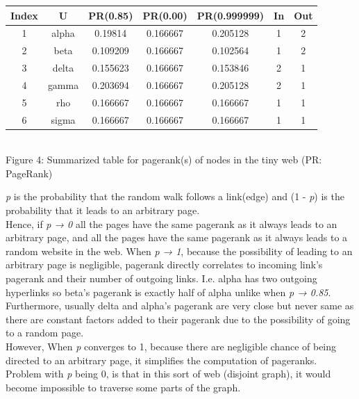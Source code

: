 \documentclass[unicode,11pt,a4paper,oneside,numbers=endperiod,openany]{scrartcl}
\begin{document}
\begin{enumerate}
 \begin{center}
  

 \begin{tabular}{| c | c | c | c | c | c | c |}
 \hline
 Index & U & PR(0.85) & PR(0.00) & PR(0.999999) & In & Out\\
 \hline
 1 & alpha & 0.19814 & 0.166667 & 0.205128 & 1 & 2 \\
 \hline
 2 & beta & 0.109209 & 0.166667 & 0.102564 & 1 & 2 \\
 \hline
 3 & delta & 0.155623 & 0.166667 & 0.153846 & 2 & 1 \\
 \hline
 4 & gamma & 0.203694 & 0.166667 & 0.205128 & 2 & 1 \\
 \hline
 5 & rho & 0.166667 & 0.166667 & 0.166667 & 1 & 1 \\
 \hline
 6 & sigma & 0.166667 & 0.166667 & 0.166667 & 1 & 1 \\
 \hline
 \end{tabular}
 \\
 \vspace{5px}
 {Figure 4: Summarized table for pagerank(s) of nodes in the tiny web (PR: PageRank)}
 \end{center}
 
 {\textit{p} is the probability that the random walk follows a link(edge) and (1 - \textit{p}) is the probability that it leads to an arbitrary page. \\
 Hence, if \textit{p → 0} all the pages have the same pagerank as it always leads to an arbitrary page, and all the pages have the same pagerank as it always leads to a random website in the web. When \textit{p → 1}, because the possibility of leading to an arbitrary page is negligible, pagerank directly correlates to incoming link's pagerank and their number of outgoing links. I.e. alpha has two outgoing hyperlinks so beta's pagerank is exactly half of alpha unlike when \textit{p → 0.85}. Furthermore, usually delta and alpha's pagerank are very close but never same as there are constant factors added to their pagerank due to the possibility of going to a random page. \\ However, When \textit{p} converges to 1, because there are negligible chance of being directed to an arbitrary page, it simplifies the computation of pageranks. \\
 
 Problem with \textit{p} being 0, is that in this sort of web (disjoint graph), it would become impossible to traverse some parts of the graph.}

\end{enumerate}
\end{document}
